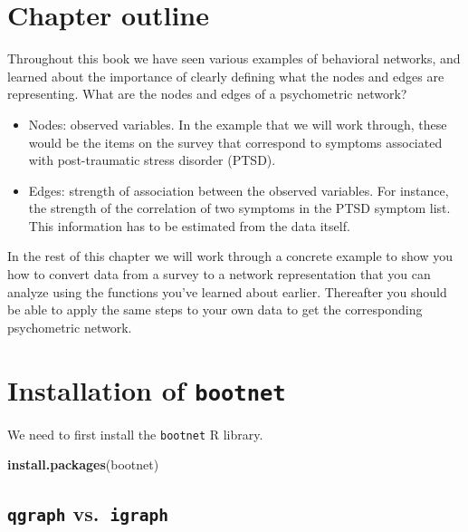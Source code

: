 \documentclass[
]{book}
\newenvironment{Shaded}{\begin{snugshade}}{\end{snugshade}}
\newcommand{\FunctionTok}[1]{\textcolor[rgb]{0.13,0.29,0.53}{\textbf{#1}}}
\newcommand{\NormalTok}[1]{#1}
\newcommand{\StringTok}[1]{\textcolor[rgb]{0.31,0.60,0.02}{#1}}
\providecommand{\tightlist}{%
  \setlength{\itemsep}{0pt}\setlength{\parskip}{0pt}}
\begin{document}
\section{Chapter outline}\label{chapter-outline}

Throughout this book we have seen various examples of behavioral networks, and learned about the importance of clearly defining what the nodes and edges are representing. What are the nodes and edges of a psychometric network?

\begin{itemize}
\tightlist
\item
  Nodes: observed variables. In the example that we will work through, these would be the items on the survey that correspond to symptoms associated with post-traumatic stress disorder (PTSD).
\item
  Edges: strength of association between the observed variables. For instance, the strength of the correlation of two symptoms in the PTSD symptom list. This information has to be estimated from the data itself.
\end{itemize}

In the rest of this chapter we will work through a concrete example to show you how to convert data from a survey to a network representation that you can analyze using the functions you've learned about earlier. Thereafter you should be able to apply the same steps to your own data to get the corresponding psychometric network.

\section{\texorpdfstring{Installation of \texttt{bootnet}}{Installation of bootnet}}\label{installation-of-bootnet}

We need to first install the \texttt{bootnet} R library.

\begin{Shaded}
\begin{Highlighting}[]
\FunctionTok{install.packages}\NormalTok{(}\StringTok{\textquotesingle{}bootnet\textquotesingle{}}\NormalTok{)}
\end{Highlighting}
\end{Shaded}

\subsection{\texorpdfstring{\texttt{qgraph} vs.~\texttt{igraph}}{qgraph vs.~igraph}}\label{qgraph-vs.-igraph}
\end{document}
